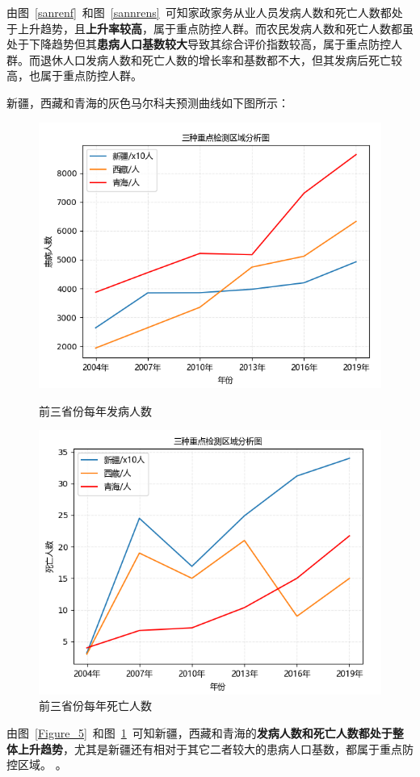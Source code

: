 \documentclass{whutmod}
\begin{document}
由图~\ref{sanrenf}~和图~\ref{sannrens}~可知家政家务从业人员发病人数和死亡人数都处于上升趋势，且\textbf{上升率较高}，属于重点防控人群。而农民发病人数和死亡人数都虽处于下降趋势但其\textbf{患病人口基数较大}导致其综合评价指数较高，属于重点防控人群。而退休人口发病人数和死亡人数的增长率和基数都不大，但其发病后死亡较高，也属于重点防控人群。

新疆，西藏和青海的灰色马尔科夫预测曲线如下图所示：
	\begin{figure}[H]
	\begin{minipage}[t]{0.5\linewidth}
		\centering
		\includegraphics[width=\textwidth]{figures/Figure_5.png}
		\caption{前三省份每年发病人数}\label{Figure_5}
	\end{minipage}
	\hfill%
	\begin{minipage}[t]{0.5\linewidth}
		\centering
		\includegraphics[width=\textwidth]{figures/Figure_1.png}
		\caption{前三省份每年死亡人数}\label{Figure_6}
	\end{minipage}
\end{figure}
由图~\ref{Figure_5}~和图~\ref{Figure_6}~可知新疆，西藏和青海的\textbf{发病人数和死亡人数都处于整体上升趋势}，尤其是新疆还有相对于其它二者较大的患病人口基数，都属于重点防控区域。
。
\end{document}
